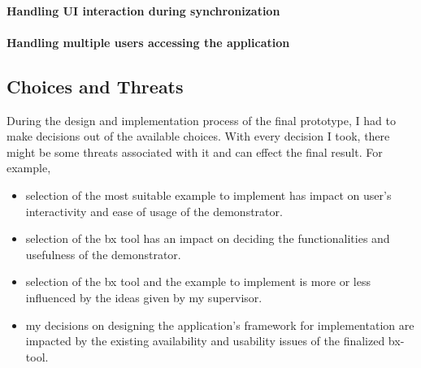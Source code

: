 \paragraph{Handling UI interaction during synchronization}


\paragraph{Handling multiple users accessing the application}


\subsection{Choices and Threats}\label{subsec:design_choicesthreats}
During the design and implementation process of the final prototype, I had to make decisions out of the available choices. With every decision I took, there might be some threats associated with it and can effect the final result. For example, 
\begin{itemize} 
	\item {selection of the most suitable example to implement has impact on user's interactivity and ease of usage of the demonstrator.}
	\item {selection of the bx tool has an impact on deciding the functionalities and usefulness of the demonstrator.}
	\item {selection of the bx tool and the example to implement is more or less influenced by the ideas given by my supervisor.} 
	\item {my decisions on designing the application's framework for implementation are impacted by the existing availability and usability issues of the finalized bx-tool.}
\end{itemize}
